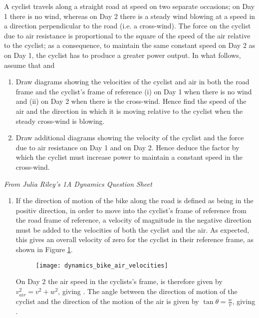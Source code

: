 %
%
\begin{problem} %
{A cyclist travels along a straight road at speed  on two separate occasions; on Day 1 there is no wind, whereas on Day 2 there is a steady wind blowing at a speed  in a direction perpendicular to the road (i.e. a cross-wind). The force on the cyclist due to air resistance is proportional to the square of the speed of the air relative to the cyclist; as a consequence, to maintain the same constant speed  on Day 2 as on Day 1, the cyclist has to produce a greater power output. In what follows, assume that  and 
\begin{enumerate}
\item Draw diagrams showing the velocities of the cyclist and air in both the road frame and the cyclist’s frame of reference (i) on Day 1 when there is no wind and (ii) on Day 2 when there is the cross-wind. Hence find the speed of the air and the
direction in which it is moving relative to the cyclist when the steady cross-wind is blowing.
\item  Draw additional diagrams showing the velocity of the cyclist and the force due to air resistance on Day 1 and on Day 2. Hence deduce the factor by which the cyclist must increase power to maintain a constant speed in the cross-wind.
\end{enumerate}
}
{\textit{From Julia Riley's 1A Dynamics Question Sheet}}
{\begin{enumerate}
\item 
If the direction of motion of the bike along the road is defined as being in the positiv   direction, in order to move into the cyclist's frame of reference from the road frame of reference, a velocity of magnitude  in the negative  direction must be added to the velocities of both the cyclist and the air. As expected, this gives an overall velocity of zero for the cyclist in their reference frame, as shown in Figure \ref{fig:dynamics_bike_air_velocities}.

\begin{figure}[h]
\centering
\texttt{[image: dynamics\_bike\_air\_velocities]}
\caption{}
\label{fig:dynamics_bike_air_velocities}
\end{figure}

On Day 2 the air speed in the cyclists's frame,  is therefore given by $v_{air}^2 = v^2 + w^2$, giving . The angle \vari{\theta} between the direction of motion of the cyclist and the direction of the motion of the air is given by $\tan \theta = \frac{w}{v}$, giving .


\end{enumerate}}
\end{problem}
